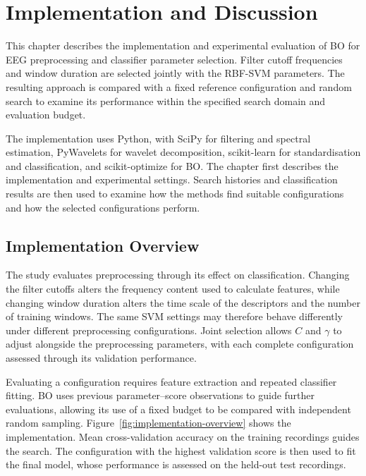 \chapter{Implementation and Discussion}
\label{chap:implementation-results}

This chapter describes the implementation and experimental
evaluation of BO for EEG preprocessing and classifier
parameter selection. Filter cutoff frequencies and window
duration are selected jointly with the RBF-SVM parameters.
The resulting approach is compared with a fixed reference
configuration and random search to examine its performance
within the specified search domain and evaluation budget.

The implementation uses Python, with SciPy for filtering
and spectral estimation, PyWavelets for wavelet decomposition,
scikit-learn for standardisation and classification, and
scikit-optimize for BO. The chapter first describes the
implementation and experimental settings. Search histories
and classification results are then used to examine how
the methods find suitable configurations and how the
selected configurations perform.


\section{Implementation Overview}
\label{sec:implementation-overview}

The study evaluates preprocessing through its effect on
classification. Changing the filter cutoffs alters the
frequency content used to calculate features, while changing
window duration alters the time scale of the descriptors
and the number of training windows. The same SVM settings
may therefore behave differently under different
preprocessing configurations. Joint selection allows
$C$ and $\gamma$ to adjust alongside the preprocessing
parameters, with each complete configuration assessed
through its validation performance.

Evaluating a configuration requires feature extraction
and repeated classifier fitting. BO uses previous
parameter--score observations to guide further evaluations,
allowing its use of a fixed budget to be compared with
independent random sampling. Figure~\ref{fig:implementation-overview}
shows the implementation. Mean cross-validation accuracy
on the training recordings guides the search. The
configuration with the highest validation score is then
used to fit the final model, whose performance is assessed
on the held-out test recordings.

